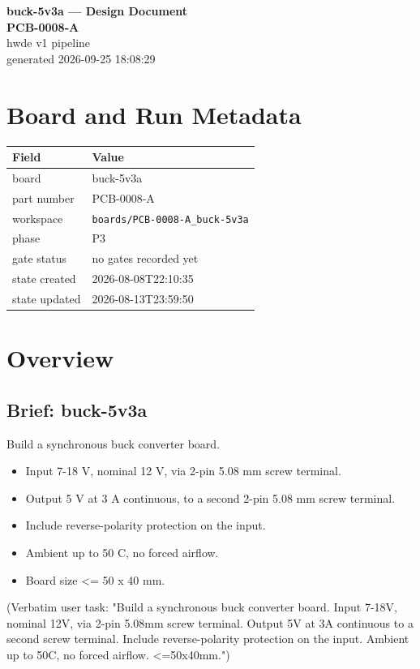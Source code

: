 \documentclass[11pt,a4paper]{article}
\begin{document}
\sloppy
\begin{center}
{\LARGE\bfseries buck-5v3a --- Design Document}\\[6pt]
{\Large\bfseries PCB-0008-A}\\[6pt]
{\large hwde v1 pipeline}\\[2pt]
generated 2026-09-25 18:08:29
\end{center}
\tableofcontents

\section{Board and Run Metadata}
{\small
\begin{longtable}{lp{11cm}}
\toprule
\textbf{Field} & \textbf{Value} \\
\midrule
\endhead
board & buck-5v3a \\
part number & PCB-0008-A \\
workspace & \texttt{boards/PCB-0008-A\_buck-5v3a} \\
phase & P3 \\
gate status & no gates recorded yet \\
state created & 2026-08-08T22:10:35 \\
state updated & 2026-08-13T23:59:50 \\
\bottomrule
\end{longtable}
}
\section{Overview}
\subsection*{Brief: buck-5v3a}
Build a synchronous buck converter board.

\begin{itemize}
\item Input 7-18 V, nominal 12 V, via 2-pin 5.08 mm screw terminal.
\item Output 5 V at 3 A continuous, to a second 2-pin 5.08 mm screw terminal.
\item Include reverse-polarity protection on the input.
\item Ambient up to 50 C, no forced airflow.
\item Board size \textless{}= 50 x 40 mm.
\end{itemize}
(Verbatim user task: "Build a synchronous buck converter board. Input 7-18V, nominal 12V, via 2-pin 5.08mm screw terminal. Output 5V at 3A continuous to a second screw terminal. Include reverse-polarity protection on the input. Ambient up to 50C, no forced airflow. \textless{}=50x40mm.")
\end{document}
